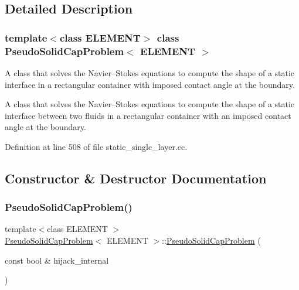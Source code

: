 \subsection{Detailed Description}
\subsubsection*{template$<$class E\+L\+E\+M\+E\+NT$>$\newline
class Pseudo\+Solid\+Cap\+Problem$<$ E\+L\+E\+M\+E\+N\+T $>$}

A class that solves the Navier--Stokes equations to compute the shape of a static interface in a rectangular container with imposed contact angle at the boundary. 

A class that solves the Navier--Stokes equations to compute the shape of a static interface between two fluids in a rectangular container with an imposed contact angle at the boundary. 

Definition at line 508 of file static\+\_\+single\+\_\+layer.\+cc.



\subsection{Constructor \& Destructor Documentation}
\mbox{\label{classPseudoSolidCapProblem_a4ac05a07dd55950bb67f7f79cb9fbb77}} 
\subsubsection{\texorpdfstring{Pseudo\+Solid\+Cap\+Problem()}{PseudoSolidCapProblem()}\hspace{0.1cm}{\footnotesize\ttfamily [1/2]}}
{\footnotesize\ttfamily template$<$class E\+L\+E\+M\+E\+NT $>$ \\
\hyperlink{classPseudoSolidCapProblem}{Pseudo\+Solid\+Cap\+Problem}$<$ E\+L\+E\+M\+E\+NT $>$\+::\hyperlink{classPseudoSolidCapProblem}{Pseudo\+Solid\+Cap\+Problem} (\begin{DoxyParamCaption}\item[{const bool \&}]{hijack\+\_\+internal }\end{DoxyParamCaption})}

